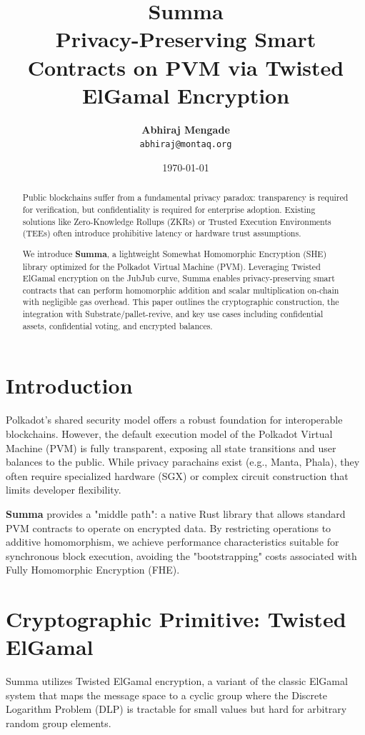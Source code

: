 \documentclass[11pt,a4paper]{article}
\title{\textbf{\Huge Summa} \\ \Large Privacy-Preserving Smart Contracts on PVM via Twisted ElGamal Encryption}
\author{\textbf{Abhiraj Mengade} \\ \texttt{abhiraj@montaq.org}}
\date{\today}
\begin{document}
\maketitle

\begin{abstract}
    Public blockchains suffer from a fundamental privacy paradox: transparency is required for verification, but confidentiality is required for enterprise adoption. Existing solutions like Zero-Knowledge Rollups (ZKRs) or Trusted Execution Environments (TEEs) often introduce prohibitive latency or hardware trust assumptions. 
    
    We introduce \textbf{Summa}, a lightweight Somewhat Homomorphic Encryption (SHE) library optimized for the Polkadot Virtual Machine (PVM). Leveraging Twisted ElGamal encryption on the JubJub curve, Summa enables privacy-preserving smart contracts that can perform homomorphic addition and scalar multiplication on-chain with negligible gas overhead. This paper outlines the cryptographic construction, the integration with Substrate/pallet-revive, and key use cases including confidential assets, confidential voting, and encrypted balances.
\end{abstract}

\tableofcontents
\newpage

\section{Introduction}
Polkadot's shared security model offers a robust foundation for interoperable blockchains. However, the default execution model of the Polkadot Virtual Machine (PVM) is fully transparent, exposing all state transitions and user balances to the public. While privacy parachains exist (e.g., Manta, Phala), they often require specialized hardware (SGX) or complex circuit construction that limits developer flexibility.

\textbf{Summa} provides a "middle path": a native Rust library that allows standard PVM contracts to operate on encrypted data. By restricting operations to additive homomorphism, we achieve performance characteristics suitable for synchronous block execution, avoiding the "bootstrapping" costs associated with Fully Homomorphic Encryption (FHE).

\section{Cryptographic Primitive: Twisted ElGamal}
Summa utilizes Twisted ElGamal encryption, a variant of the classic ElGamal system that maps the message space to a cyclic group where the Discrete Logarithm Problem (DLP) is tractable for small values but hard for arbitrary random group elements.
\end{document}
